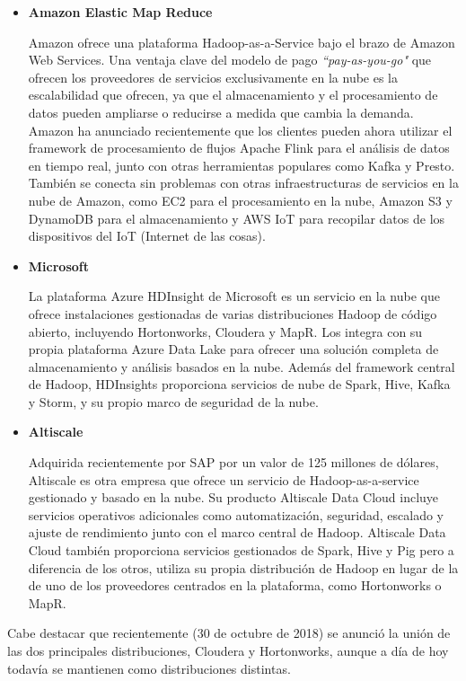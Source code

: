 \begin{itemize}
    \item \textbf{Amazon Elastic Map Reduce}\cite{amazonemr}

Amazon ofrece una plataforma Hadoop-as-a-Service bajo el brazo de Amazon Web Services. Una ventaja clave del modelo de pago \textit{“pay-as-you-go"} que ofrecen los proveedores de servicios exclusivamente en la nube es la escalabilidad que ofrecen, ya que el almacenamiento y el procesamiento de datos pueden ampliarse o reducirse a medida que cambia la demanda. Amazon ha anunciado recientemente que los clientes pueden ahora utilizar el framework de procesamiento de flujos Apache Flink para el análisis de datos en tiempo real, junto con otras herramientas populares como Kafka y Presto. También se conecta sin problemas con otras infraestructuras de servicios en la nube de Amazon, como EC2 para el procesamiento en la nube, Amazon S3 y DynamoDB para el almacenamiento y AWS IoT para recopilar datos de los dispositivos del IoT (Internet de las cosas). 

    \item \textbf{Microsoft}\cite{microsofthdinsight}

La plataforma Azure HDInsight de Microsoft es un servicio en la nube que ofrece instalaciones gestionadas de varias distribuciones Hadoop de código abierto, incluyendo Hortonworks, Cloudera y MapR. Los integra con su propia plataforma Azure Data Lake para ofrecer una solución completa de almacenamiento y análisis basados en la nube. Además del framework central de Hadoop, HDInsights proporciona servicios de nube de Spark, Hive, Kafka y Storm, y su propio marco de seguridad de la nube. 

    \item \textbf{Altiscale}\cite{altiscale} 

Adquirida recientemente por SAP por un valor de 125 millones de dólares, Altiscale es otra empresa que ofrece un servicio de Hadoop-as-a-service gestionado y basado en la nube. Su producto Altiscale Data Cloud incluye servicios operativos adicionales como automatización, seguridad, escalado y ajuste de rendimiento junto con el marco central de Hadoop. Altiscale Data Cloud también proporciona servicios gestionados de Spark, Hive y Pig pero a diferencia de los otros, utiliza su propia distribución de Hadoop en lugar de la de uno de los proveedores centrados en la plataforma, como Hortonworks o MapR.
\end{itemize}

Cabe destacar que recientemente (30 de octubre de 2018) se anunció la unión de las dos principales distribuciones, Cloudera y Hortonworks, aunque a día de hoy todavía se mantienen como distribuciones distintas.

